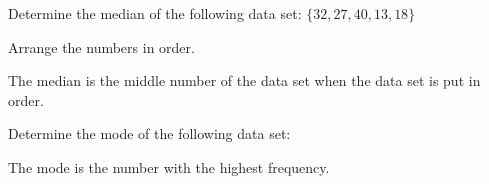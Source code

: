 \documentclass{ximera}
\begin{document}
\begin{question}
Determine the median of the following data set: $\{32, 27, 40, 13, 18\}$

    \begin{multipleChoice}
    \end{multipleChoice}
    \begin{hint}
      Arrange the numbers in order.
    \end{hint}
    \begin{hint}
      The median is the middle number of the data set when the data set is put in order.
    \end{hint}

\end{question}

\begin{question}
Determine the mode of the following data set:
\begin{image}
\end{image}


    \begin{multipleChoice}
    \end{multipleChoice}
    \begin{hint}
      The mode is the number with the highest frequency.
    \end{hint}

\end{question}
\end{document}
